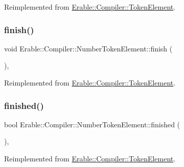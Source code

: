 Reimplemented from \mbox{\hyperlink{class_erable_1_1_compiler_1_1_token_element_a36d20884e5ba6cfa46fcd28711be9589}{Erable\+::\+Compiler\+::\+Token\+Element}}.

\mbox{\label{class_erable_1_1_compiler_1_1_number_token_element_a06b45068c205e86e187d27685fe59e96}} 
\subsubsection{\texorpdfstring{finish()}{finish()}}
{\footnotesize\ttfamily void Erable\+::\+Compiler\+::\+Number\+Token\+Element\+::finish (\begin{DoxyParamCaption}{ }\end{DoxyParamCaption})\hspace{0.3cm}{\ttfamily [override]}, {\ttfamily [virtual]}}



Reimplemented from \mbox{\hyperlink{class_erable_1_1_compiler_1_1_token_element_a481e4deb721a1a5f435ee27f850cdf81}{Erable\+::\+Compiler\+::\+Token\+Element}}.

\mbox{\label{class_erable_1_1_compiler_1_1_number_token_element_a7f8f35dcc3dac8a2e7566867304feb23}} 
\subsubsection{\texorpdfstring{finished()}{finished()}}
{\footnotesize\ttfamily bool Erable\+::\+Compiler\+::\+Number\+Token\+Element\+::finished (\begin{DoxyParamCaption}{ }\end{DoxyParamCaption})\hspace{0.3cm}{\ttfamily [override]}, {\ttfamily [virtual]}}



Reimplemented from \mbox{\hyperlink{class_erable_1_1_compiler_1_1_token_element_a1ff3e31b4064cd22463c91130a819646}{Erable\+::\+Compiler\+::\+Token\+Element}}.




